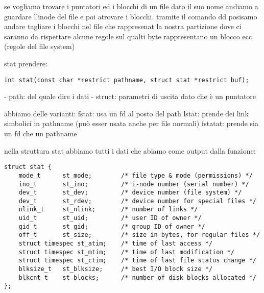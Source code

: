 se vogliamo trovare i puntatori ed i blocchi di un file dato il suo nome andiamo a guardare l'inode del file e poi atrovare i blocchi. tramite il comando dd posisamo andare tagliare i blocchi nel file che rappresenat la nostra partizione dove ci saranno da rispettare alcune regole sul qualti byte rappresentano un blocco ecc (regole del file system) 

stat prendere:

\begin{lstlisting}
int stat(const char *restrict pathname, struct stat *restrict buf);
\end{lstlisting}

- path: del quale dire i dati
- struct: parametri di uscita dato che è un puntatore

abbiamo delle varianti:
fstat: usa un fd al posto del path
lstat: prende dei link simbolici in pathname (può esser usata anche per file normali)
fstatat: prende sia un fd che un pathname


nella struttura stat abbiamo tutti i dati che abiamo come output dalla funzione:

\begin{lstlisting}
struct stat {
	mode_t		st_mode;		/* file type & mode (permissions) */
	ino_t		st_ino;			/* i-node number (serial number) */
	dev_t		st_dev;			/* device number (file system) */
	dev_t		st_rdev;		/* device number for special files */
	nlink_t		st_nlink;		/* number of links */
	uid_t		st_uid;			/* user ID of owner */
	gid_t		st_gid;			/* group ID of owner */
	off_t		st_size;		/* size in bytes, for regular files */
	struct timespec st_atim;	/* time of last access */
	struct timespec st_mtim;	/* time of last modification */
	struct timespec st_ctim;	/* time of last file status change */
	blksize_t	st_blksize;		/* best I/O block size */
	blkcnt_t	st_blocks;		/* number of disk blocks allocated */
};
\end{lstlisting}